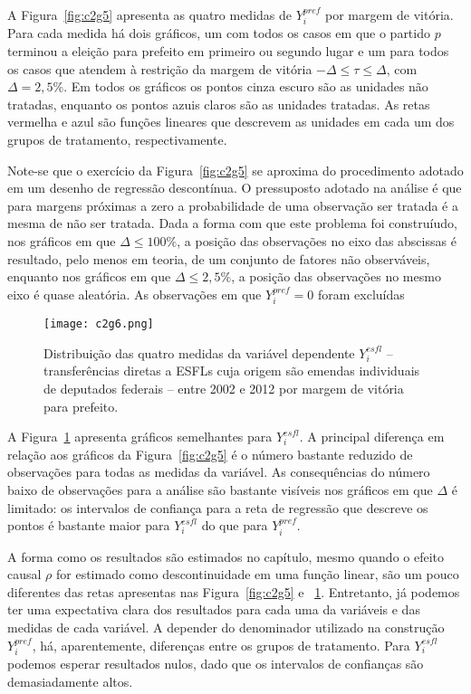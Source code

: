 A Figura~\ref{fig:c2g5} apresenta as quatro medidas de $Y_{i}^{pref}$ por margem de vitória. Para cada medida há dois gráficos, um com todos os casos em que o partido $p$ terminou a eleição para prefeito em primeiro ou segundo lugar e um para todos os casos que atendem à restrição da margem de vitória $-\Delta \leq \tau \leq \Delta$, com $\Delta=2,5\%$. Em todos os gráficos os pontos cinza escuro são as unidades não tratadas, enquanto os pontos azuis claros são as unidades tratadas. As retas vermelha e azul são funções lineares que descrevem as unidades em cada um dos grupos de tratamento, respectivamente. 

Note-se que o exercício da Figura~\ref{fig:c2g5} se aproxima do procedimento adotado em um desenho de regressão descontínua. O pressuposto adotado na análise é que para margens próximas a zero a probabilidade de uma observação ser tratada é a mesma de não ser tratada. Dada a forma com que este problema foi construíudo, nos gráficos em que $\Delta \leq 100\%$, a posição das observações no eixo das abscissas é resultado, pelo menos em teoria, de um conjunto de fatores não observáveis, enquanto nos gráficos em que $\Delta \leq 2,5\%$, a posição das observações no mesmo eixo é quase aleatória. As observações em que $Y_{i}^{pref}=0$ foram excluídas

\begin{figure}[htp]
	\centering
	\texttt{[image: c2g6.png]}
	\caption{Distribuição das quatro medidas da variável dependente $Y_{i}^{esfl}$ -- transferências diretas a ESFLs cuja origem são emendas individuais de deputados federais -- entre 2002 e 2012 por margem de vitória para prefeito.}
	\label{fig:c2g6}
\end{figure}

A Figura~\ref{fig:c2g6} apresenta gráficos semelhantes para $Y_{i}^{esfl}$. A principal diferença em relação aos gráficos da Figura~\ref{fig:c2g5} é o número bastante reduzido de observações para todas as medidas da variável. As consequências do número baixo de observações para a análise são bastante visíveis nos gráficos em que $\Delta$ é limitado: os intervalos de confiança para a reta de regressão que descreve os pontos é bastante maior para $Y_{i}^{esfl}$ do que para $Y_{i}^{pref}$. 

A forma como os resultados são estimados no capítulo, mesmo quando o efeito causal $\rho$ for estimado como descontinuidade em uma função linear, são um pouco diferentes das retas apresentas nas Figura~\ref{fig:c2g5} e ~\ref{fig:c2g6}. Entretanto, já podemos ter uma expectativa clara dos resultados para cada uma da variáveis e das medidas de cada variável. A depender do denominador utilizado na construção $Y_{i}^{pref}$, há, aparentemente, diferenças entre os grupos de tratamento. Para $Y_{i}^{esfl}$ podemos esperar resultados nulos, dado que os intervalos de confianças são demasiadamente altos.

